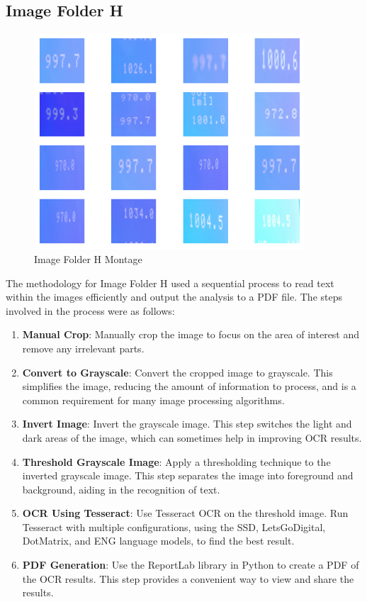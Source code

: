\newpage

\subsection{Image Folder H}

\begin{figure}[ht]
    \centering
    \includegraphics[width=0.9\textwidth]{Figures/EDA_Charts/9/montage.png}
    \caption[Image Folder H Montage]{Image Folder H Montage}
    \label{fig:Image Folder H Montage}
\end{figure}

The methodology for Image Folder H used a sequential process to read text within the images efficiently and output the analysis to a PDF file. The steps involved in the process were as follows:

\begin{enumerate}
    \item \textbf{Manual Crop}: Manually crop the image to focus on the area of interest and remove any irrelevant parts.
    \item \textbf{Convert to Grayscale}: Convert the cropped image to grayscale. This simplifies the image, reducing the amount of information to process, and is a common requirement for many image processing algorithms.
    \item \textbf{Invert Image}: Invert the grayscale image. This step switches the light and dark areas of the image, which can sometimes help in improving OCR results.
    \item \textbf{Threshold Grayscale Image}: Apply a thresholding technique to the inverted grayscale image. This step separates the image into foreground and background, aiding in the recognition of text.
    \item \textbf{OCR Using Tesseract}: Use Tesseract OCR on the threshold image. Run Tesseract with multiple configurations, using the SSD, LetsGoDigital, DotMatrix, and ENG language models, to find the best result.
    \item \textbf{PDF Generation}: Use the ReportLab library in Python to create a PDF of the OCR results. This step provides a convenient way to view and share the results.
\end{enumerate}

